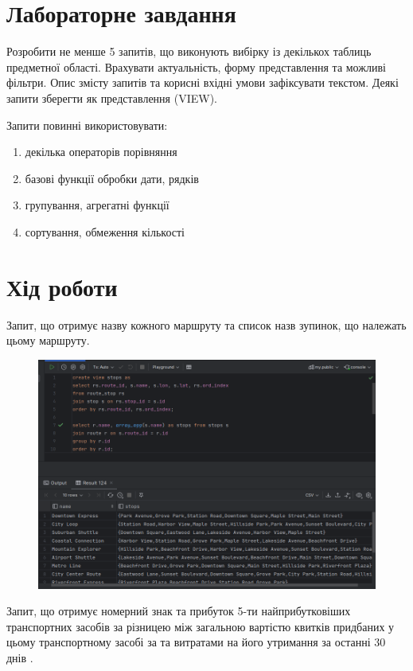 \documentclass[14pt]{extreport}
\begin{document}
\begin{normalsize}
	\section*{Лабораторне завдання}
	Розробити не менше 5 запитів, що виконують вибірку із декількох таблиць предметної області. Врахувати актуальність, форму представлення та можливі фільтри. Опис змісту запитів та корисні вхідні умови зафіксувати текстом. Деякі запити зберегти як представлення (VIEW).
	
	Запити повинні використовувати:
	\begin{enumerate}
		\item декілька операторів порівняння
		\item базові функції обробки дати, рядків
		\item групування, агрегатні функції
		\item сортування, обмеження кількості
	\end{enumerate}
	
	\section*{Хід роботи}
	Запит, що отримує назву кожного маршруту та список назв зупинок, що належать цьому маршруту.
	
	\begin{figure}[H]
		\centering
		\includegraphics[scale=0.5]{1}
		\caption{}
	\end{figure}
	
	Запит, що отримує номерний знак та прибуток 5-ти найприбутковіших транспортних засобів за різницею між загальною вартістю квитків придбаних у цьому транспортному засобі за та витратами на його утримання за останні 30 днів .
	

\end{normalsize}
\end{document}
